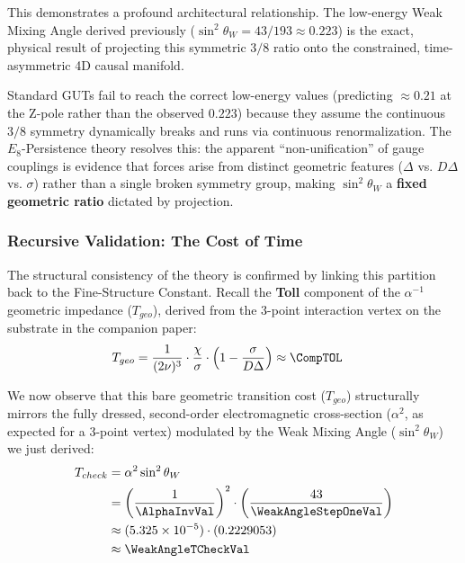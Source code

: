 This demonstrates a profound architectural relationship. The low-energy Weak Mixing Angle derived previously ($\sin^2 \theta_W = 43/193 \approx 0.223$) is the exact, physical result of projecting this symmetric $3/8$ ratio onto the constrained, time-asymmetric 4D causal manifold. 

Standard GUTs fail to reach the correct low-energy values (predicting $\approx 0.21$ at the Z-pole rather than the observed $0.223$) because they assume the continuous $3/8$ symmetry dynamically breaks and runs via continuous renormalization. The $E_8$-Persistence theory resolves this: the apparent ``non-unification'' of gauge couplings is evidence that forces arise from distinct geometric features ($\Delta$ vs. $D\Delta$ vs. $\sigma$) rather than a single broken symmetry group, making $\sin^2\theta_W$ a \textbf{fixed geometric ratio} dictated by projection.


\subsubsection{Recursive Validation: The Cost of Time}
The structural consistency of the theory is confirmed by linking this partition back to the Fine-Structure Constant. Recall the \textbf{Toll} component of the $\alpha^{-1}$ geometric impedance ($T_{geo}$), derived from the 3-point interaction vertex on the substrate in the companion paper\cite{meyer_informational_2026}:
\begin{equation}
\begin{split}
    T_{geo} &= \frac{1}{(2\nu)^3} \cdot \frac{\chi}{\sigma} \cdot \left(1 - \frac{\sigma}{D\Delta} \right) \approx \CompTOL
\end{split}
\end{equation}

We now observe that this bare geometric transition cost ($T_{geo}$) structurally mirrors the fully dressed, second-order electromagnetic cross-section ($\alpha^2$, as expected for a 3-point vertex) modulated by the Weak Mixing Angle ($\sin^2 \theta_W$) we just derived:
\begin{equation}
\begin{split}
T_{check} &= \alpha^2 \sin^2 \theta_W \\
&= \left(\frac{1}{\AlphaInvVal}\right)^2 \cdot \left(\frac{43}{\WeakAngleStepOneVal}\right) \\
&\approx (5.325 \times 10^{-5}) \cdot (0.2229053) \\
&\approx \WeakAngleTCheckVal
\end{split}
\end{equation}

